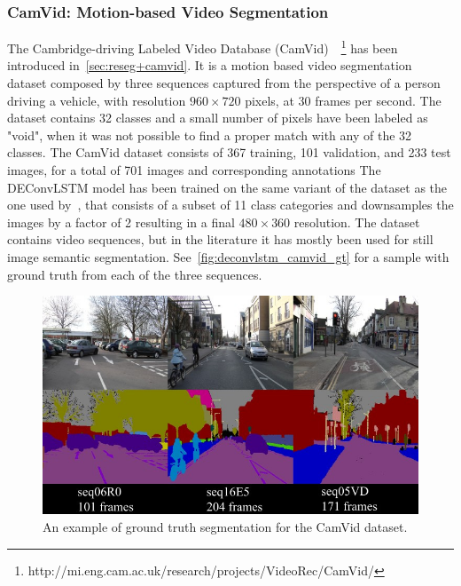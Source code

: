\subsubsection{CamVid: Motion-based Video Segmentation}
\label{sec:deconvLSTM_camvid}
The Cambridge-driving Labeled Video Database (CamVid)~\citep{
Brostow2010semantic}~\footnote{%
http://mi.eng.cam.ac.uk/research/projects/VideoRec/CamVid/}
has been introduced in~\autoref{sec:reseg+camvid}. It is a motion based video
segmentation dataset composed by three sequences captured from the perspective
of a person driving a vehicle, with resolution $960 \times 720$ pixels, at 30
frames per second. The dataset contains 32 classes and a small number of pixels
have been labeled as "void", when it was not possible to find a proper match
with any of the 32 classes. The CamVid dataset consists of 367 training, 101
validation, and 233 test images, for a total of 701 images and corresponding
annotations The DEConvLSTM model has been trained on the same variant of the
dataset as the one used by~\citep{badrinarayanan2015segnet}, that consists of a
subset of 11 class categories and downsamples the images by a factor of 2
resulting in a final $480 \times 360$ resolution. The dataset contains video
sequences, but in the literature it has mostly been used for still image
semantic segmentation. See~\autoref{fig:deconvlstm_camvid_gt} for a sample with
ground truth from each of the three sequences.

\begin{figure}[t]
    \centering
    \includegraphics[width=0.8\columnwidth]{img/deconvLSTM/camvid_gt.jpg}
    \caption{An example of ground truth segmentation for the CamVid dataset.}
    \label{fig:deconvlstm_camvid_gt}
\end{figure}

